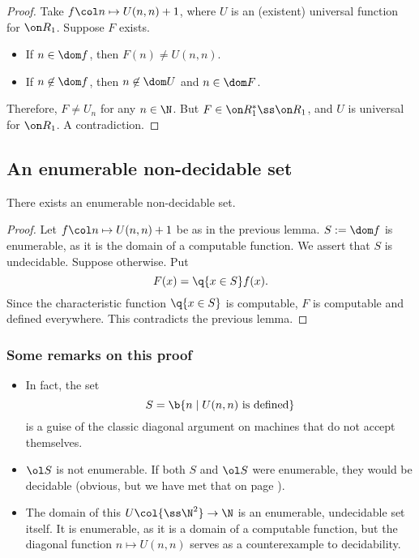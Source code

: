 \begin{proof}
  Take $f \col n \mapsto U(n,n)+1$, where $U$ is an (existent) universal function for $\Comp_1$.
  Suppose $F$ exists.
  \begin{itemize}
    \item If $n \in \dom f$, then $F(n) \ne U(n, n)$.
    \item If $n \not\in \dom f$, then $n \not\in \dom U$ and $n \in \dom F$.
  \end{itemize}
  Therefore, $F \ne U_n$ for any $n \in \N$.
  But $F \in \Comp_1^* \ss \Comp_1$, and $U$ is universal for $\Comp_1$.
  A contradiction.
\end{proof}

\subsection{An enumerable non-decidable set}

\begin{theorem}
  There exists an enumerable non-decidable set.  
\end{theorem}

\begin{proof}
  Let $f \col n \mapsto U(n,n)+1$ be as in the previous lemma.
  $S := \dom f$ is enumerable, as it is the domain of a computable function.
  We assert that $S$ is undecidable.
  Suppose otherwise.
  Put
  $$
  F(x) = \q{x \in S} f(x).
  $$
  Since the characteristic function $\q{x \in S}$ is computable, $F$ is computable and defined everywhere.
  This contradicts the previous lemma.
\end{proof}

\subsubsection{Some remarks on this proof}

\begin{itemize}
  \item In fact, the set
  $$ S = \b{ n \mid U(n, n) \text{ is defined}} $$
  is a guise of the classic diagonal argument on machines that do not accept themselves.
  \item $\ol S$ is not enumerable. If both $S$ and $\ol S$ were enumerable, they would be decidable (obvious, but we have met that on page \pageref{Post's criterion}).
  \item The domain of this $U \col {\ss \N^2} \to \N$ is an enumerable, undecidable set itself. It is enumerable, as it is a domain of a computable function, but the diagonal function $n \mapsto U(n, n)$ serves as a counterexample to decidability.
\end{itemize}

